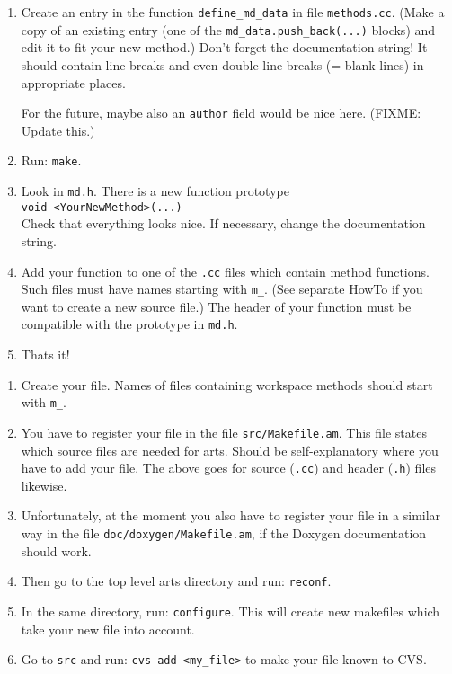 \begin{enumerate}
\item Create an entry in the function \verb|define_md_data| in file \verb|methods.cc|.
  (Make a copy of an existing entry (one of the
  \verb|md_data.push_back(...)| blocks) and edit it to fit your new
  method.) Don't forget the documentation string! It should contain
  line breaks and even double line breaks (= blank lines) in
  appropriate places.
  
  For the future, maybe also an \verb|author| field would be nice
  here. (FIXME: Update this.)
\item Run:
  \verb|make|.
\item Look in \verb|md.h|. There is a new function prototype\\
  \verb|void <YourNewMethod>(...)|\\
  Check that everything looks nice.
  If necessary, change the documentation string.
\item Add your function to one of the \verb|.cc| files which contain method
  functions. Such files must have names starting with \verb|m_|. (See
  separate HowTo if you want to create a new source file.) The header
  of your function must be compatible with the prototype in \verb|md.h|.
\item Thats it!
\end{enumerate}


\begin{enumerate}
\item Create your file. Names of files containing workspace methods should
  start with \verb|m_|.
\item You have to register your file in the file \verb|src/Makefile.am|.
  This file states which source files are needed for arts. Should be
  self-explanatory where you have to add your file. The above goes for
  source (\verb|.cc|) and header (\verb|.h|) files likewise.
\item Unfortunately, at the moment you also have to register your file
  in a similar way in the file \verb|doc/doxygen/Makefile.am|, if the
  Doxygen documentation should work. 
\item Then go to the top level arts directory and run: \verb|reconf|.
\item In the same directory, run: \verb|configure|.  This will create
  new makefiles which take your new file into account.
\item Go to \verb|src| and run: \verb|cvs add <my_file>| to make your
  file known to CVS.
\end{enumerate}


